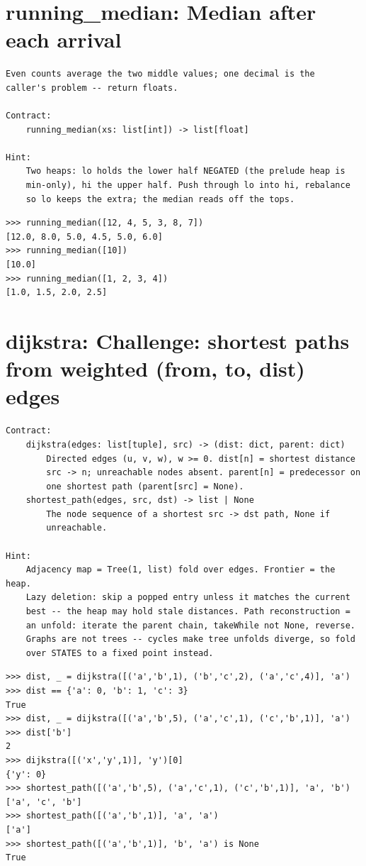 \documentclass[10pt,letterpaper]{book}
\begin{document}
\section{running\_median: Median after each arrival}
\begin{lstlisting}[style=ex]
Even counts average the two middle values; one decimal is the
caller's problem -- return floats.

Contract:
    running_median(xs: list[int]) -> list[float]

Hint:
    Two heaps: lo holds the lower half NEGATED (the prelude heap is
    min-only), hi the upper half. Push through lo into hi, rebalance
    so lo keeps the extra; the median reads off the tops.
\end{lstlisting}
\begin{lstlisting}[style=ex]
>>> running_median([12, 4, 5, 3, 8, 7])
[12.0, 8.0, 5.0, 4.5, 5.0, 6.0]
>>> running_median([10])
[10.0]
>>> running_median([1, 2, 3, 4])
[1.0, 1.5, 2.0, 2.5]
\end{lstlisting}

\section{dijkstra: Challenge: shortest paths from weighted (from, to, dist) edges}
\begin{lstlisting}[style=ex]
Contract:
    dijkstra(edges: list[tuple], src) -> (dist: dict, parent: dict)
        Directed edges (u, v, w), w >= 0. dist[n] = shortest distance
        src -> n; unreachable nodes absent. parent[n] = predecessor on
        one shortest path (parent[src] = None).
    shortest_path(edges, src, dst) -> list | None
        The node sequence of a shortest src -> dst path, None if
        unreachable.

Hint:
    Adjacency map = Tree(1, list) fold over edges. Frontier = the heap.
    Lazy deletion: skip a popped entry unless it matches the current
    best -- the heap may hold stale distances. Path reconstruction =
    an unfold: iterate the parent chain, takeWhile not None, reverse.
    Graphs are not trees -- cycles make tree unfolds diverge, so fold
    over STATES to a fixed point instead.
\end{lstlisting}
\begin{lstlisting}[style=ex]
>>> dist, _ = dijkstra([('a','b',1), ('b','c',2), ('a','c',4)], 'a')
>>> dist == {'a': 0, 'b': 1, 'c': 3}
True
>>> dist, _ = dijkstra([('a','b',5), ('a','c',1), ('c','b',1)], 'a')
>>> dist['b']
2
>>> dijkstra([('x','y',1)], 'y')[0]
{'y': 0}
>>> shortest_path([('a','b',5), ('a','c',1), ('c','b',1)], 'a', 'b')
['a', 'c', 'b']
>>> shortest_path([('a','b',1)], 'a', 'a')
['a']
>>> shortest_path([('a','b',1)], 'b', 'a') is None
True
\end{lstlisting}
\end{document}
